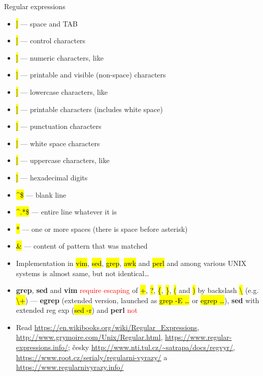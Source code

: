 \documentclass[compress, ucs, xelatex, 11pt, xcolor=svgnames,
  hyperref={
    bookmarks=true,
    unicode=true,
    colorlinks=true,
    pdftitle={Linux, command line and MetaCentrum},
    plainpages=false,
    pdfauthor={Vojtech Zeisek},
    pdfsubject={Course about use of Linux command line, writing shell scripts and using MetaCentrum of CESNET},
    pdfcreator={XeLaTeX},
    pdfkeywords={Linux, GNU, BASH, shell, command line, MetaCentrum},
    linkcolor=DarkRed,
    anchorcolor=DarkBlue,
    citecolor=Indigo,
    filecolor=NavyBlue,
    menucolor=DarkMagenta,
    urlcolor=DarkBlue,
    pdftex},
  url={hyphens, lowtilde} %
  ]{beamer}
\renewcommand{\texttt}[1]{\hl{\ttfamily #1}}
\renewcommand{\alert}[1]{\textcolor{red}{#1}}
\begin{document}
\begin{frame}[allowframebreaks]{Regular expressions}
\begin{itemize}
    \item \alert{\texttt{[[:blank:]]}} --- space and TAB
    \item \alert{\texttt{[[:cntrl:]]}} --- control characters
    \item \alert{\texttt{[[:digit:]]}} --- numeric characters, like \alert{\texttt{[0-9]}}
    \item \alert{\texttt{[[:graph:]]}} --- printable and visible (non-space) characters
    \item \alert{\texttt{[[:lower:]]}} --- lowercase characters, like \alert{\texttt{[a-z]}}
    \item \alert{\texttt{[[:print:]]}} --- printable characters (includes white space)
    \item \alert{\texttt{[[:punct:]]}} --- punctuation characters
    \item \alert{\texttt{[[:space:]]}} --- white space characters
    \item \alert{\texttt{[[:upper:]]}} --- uppercase characters, like \alert{\texttt{[A-Z]}}
    \item \alert{\texttt{[[:xdigit:]]}} --- hexadecimal digits
    \item \alert{\texttt{\textasciicircum\$}} --- blank line
    \item \alert{\texttt{\textasciicircum.*\$}} --- entire line whatever it is
    \item \alert{\texttt{ *}} --- one or more spaces (there is space before asterisk)
    \item \alert{\texttt{\&}} --- content of pattern that was matched
    \item Implementation in \texttt{vim}, \texttt{sed}, \texttt{grep}, \texttt{awk} and \texttt{perl} and among various UNIX systems is almost same, but not identical\ldots
    \item \textbf{grep}, \textbf{sed} and \textbf{vim} \alert{require escaping} of \alert{\texttt{+}}, \alert{\texttt{?}}, \alert{\texttt{\{}}, \alert{\texttt{\}}}, \alert{\texttt{(}} and \alert{\texttt{)}} by backslash \alert{\texttt{\textbackslash}} (e.g. \texttt{\textbackslash +}) --- \textbf{egrep} (extended version, launched as \texttt{grep -E \ldots} or \texttt{egrep \ldots}), \textbf{sed} with extended reg exp (\texttt{sed -r}) and \textbf{perl} \alert{not}
    \item Read \url{https://en.wikibooks.org/wiki/Regular_Expressions}, \url{http://www.grymoire.com/Unix/Regular.html}, \url{https://www.regular-expressions.info/}; česky \url{http://www.nti.tul.cz/~satrapa/docs/regvyr/}, \url{https://www.root.cz/serialy/regularni-vyrazy/} a \url{https://www.regularnivyrazy.info/}

\end{itemize}
\end{frame}
\end{document}
